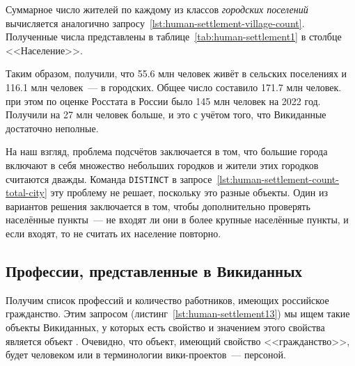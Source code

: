 Суммарное число жителей по каждому из классов \emph{городских поселений} 
вычисляется аналогично запросу~\ref{lst:human-settlement-village-count}. 
Полученные числа представлены в таблице~\ref{tab:human-settlement1} в столбце <<Население>>. 

Таким образом, получили, что \num{55.6} млн человек живёт в сельских поселениях и \num{116.1} млн человек~--- в городских. 
Общее число составило \num{171.7} млн человек. 
при этом по оценке Росстата в России было 145 млн человек на 2022 год. 
Получили на 27 млн человек больше, и это с учётом того, что Викиданные достаточно неполные. 

На наш взгляд, проблема подсчётов заключается в том, 
что большие города включают в себя множество небольших городков и жители этих городков считаются дважды. 
Команда \lstinline|DISTINCT|%
%
%
%
%
в запросе~\ref{lst:human-settlement-count-total-city} 
эту проблему не решает, поскольку это разные объекты. 
Один из вариантов решения заключается в том, 
чтобы дополнительно проверять населённые пункты~---  
не входят ли они в более крупные населённые пункты, 
и если входят, то не считать их население повторно. 



\subsection{Профессии, представленные в Викиданных}

Получим список профессий и количество работников, 
имеющих российское гражданство. 
Этим запросом (листинг~\ref{lst:human-settlement13}) 
мы ищем такие объекты Викиданных, 
у которых есть свойство  
и значением этого свойства является объект . 
Очевидно, что объект, имеющий свойство <<гражданство>>, будет человеком 
или в терминологии вики-проектов~--- персоной. 


